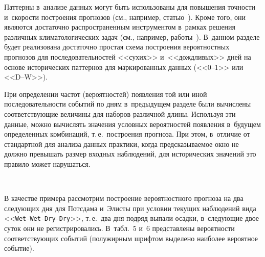 \begin{multicols}{2}
Паттерны в~анализе данных могут быть использованы для повышения точности 
и~скорости построения прогнозов (см., например, статью~\cite{Gould2008}).\linebreak
 Кроме
того, они являются достаточно распространенным инструментом в~рамках
решения различных климатологических задач (см., например,\linebreak
работы~\cite{Abaurrea2005,Stopa2013}). В~данном разделе будет реализована
достаточно простая схема построения вероятностных прогнозов для
последовательностей <<сухих>> и~<<дождливых>> дней на основе исторических
паттернов для маркированных данных (<<0--1>> или <<D--W>>).

При определении частот (вероятностей) появления той или иной
последовательности событий по дням в~предыдущем разделе были вычислены
соответствующие величины для наборов различной длины. Используя эти данные,
можно вычислять значения условных вероятностей появления в~будущем
определенных комбинаций, т.\,е.\ построения прогноза. При этом, в~отличие от
стандартной для анализа данных практики, когда пред\-ска\-зы\-ва\-емое окно не должно
превышать размер входных наблюдений, для исторических значений это правило
может нарушаться.


\begin{figure*}[b] %
\vspace*{1pt}
 \begin{center}
 \mbox{%
 \epsfxsize=163.425mm 
 }
\end{center}
\vspace*{-11pt}
\vspace*{-6pt}
\end{figure*}
 


В качестве примера рассмотрим построение вероятностного прогноза на два
следующих дня для Потсдама и~Элисты при условии текущих наблюдений
вида <<\verb"Wet-Wet-Dry-Dry">>, т.\,е.\ два дня подряд выпали осадки, в~следующие
двое суток они не регистрировались. В~табл.~5 
и~6 представлены вероятности соответствующих событий
(полужирным шрифтом выделено наиболее вероятное событие).\linebreak\vspace*{-12pt}


\end{multicols}

